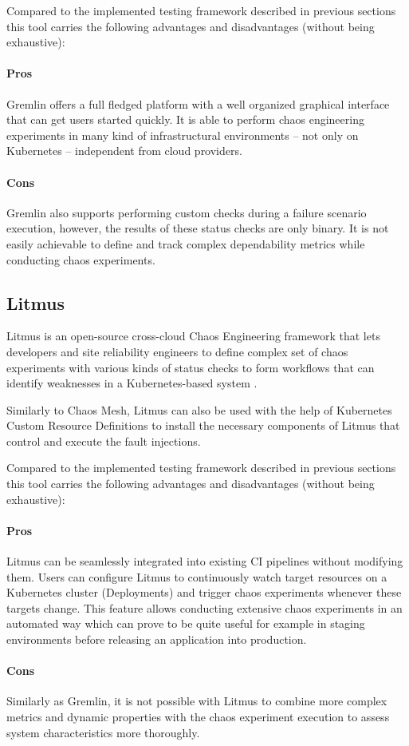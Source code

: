 Compared to the implemented testing framework described in previous sections this tool carries the following advantages and disadvantages (without being exhaustive):

\paragraph{Pros} Gremlin offers a full fledged platform with a well organized graphical interface that can get users started quickly. It is able to perform chaos engineering experiments in many kind of infrastructural environments -- not only on Kubernetes -- independent from cloud providers.

\paragraph{Cons} Gremlin also supports performing custom checks during a failure scenario execution, however, the results of these status checks are only binary. It is not easily achievable to define and track complex dependability metrics while conducting chaos experiments.

\subsection{Litmus}

Litmus is an open-source cross-cloud Chaos Engineering framework that lets developers and site reliability engineers to define complex set of chaos experiments with various kinds of status checks to form workflows that can identify weaknesses in a Kubernetes-based system \cite{Litmus}.

Similarly to Chaos Mesh, Litmus can also be used with the help of Kubernetes Custom Resource Definitions to install the necessary components of Litmus that control and execute the fault injections.

Compared to the implemented testing framework described in previous sections this tool carries the following advantages and disadvantages (without being exhaustive):

\paragraph{Pros} Litmus can be seamlessly integrated into existing CI pipelines without modifying them. Users can configure Litmus to continuously watch target resources on a Kubernetes cluster (\eg Deployments) and trigger chaos experiments whenever these targets change. This feature allows conducting extensive chaos experiments in an automated way which can prove to be quite useful for example in staging environments before releasing an application into production.

\paragraph{Cons} Similarly as Gremlin, it is not possible with Litmus to combine more complex metrics and dynamic properties with the chaos experiment execution to assess system characteristics more thoroughly.
